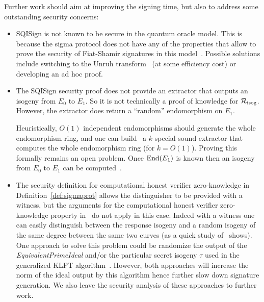 Further work should aim at improving the signing time, but also to address some outstanding security concerns:
\begin{itemize}
    \item SQISign is not known to be secure in the quantum oracle model. This is because the sigma protocol does not have any of the properties that allow to prove the security of Fiat-Shamir signatures in this model~\cite{KLS18}. Possible solutions include switching to the Unruh transform~\cite{Unruh15} (at some efficiency cost) or developing an ad hoc proof.
    \item The SQISign security proof does not provide an extractor that outputs an isogeny from $E_0$ to $E_1$. So it is not technically a proof of knowledge for $\R[isog]$. 
    However, the extractor does return a ``random'' endomorphism on $E_1$.
    
    Heuristically, $O(1)$ independent endomorphisms should generate the whole endomorphism ring, and one can build~\cite{EHLMP20} a $k$-special sound extractor that computes the whole endomorphism ring (for $k=O(1)$). Proving this formally remains an open problem.
    Once $\End(E_1)$ is known then an isogeny from $E_0$ to $E_1$ can be computed~\cite{Wes22}.
    \item The security definition for computational honest verifier zero-knowledge in Definition~\ref{def:sigmaprot} allows the distinguisher to be provided with a witness, but the arguments for the computational honest verifier zero-knowledge property in~\cite{DFKLPW20} do not apply in this case. Indeed with a witness one can easily distinguish between the response isogeny and a random isogeny of the same degree between the same two curves (as a quick study of~\cite[Figure 3]{DFKLPW20} shows). One approach to solve this problem could be randomize the output of the \emph{EquivalentPrimeIdeal} and/or the particular secret isogeny $\tau$ used in the generalized KLPT algorithm~\cite{DFKLPW20}. However, both approaches will increase the norm of the ideal output by this algorithm hence further slow down signature generation. We also leave the security analysis of these approaches to further work.
\end{itemize}







